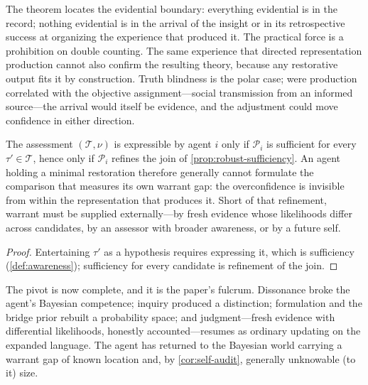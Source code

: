 The theorem locates the evidential boundary: everything evidential is in
the record; nothing evidential is in the arrival of the insight or in its
retrospective success at organizing the experience that produced it.  The
practical force is a prohibition on double counting.  The same experience
that directed representation production cannot also confirm the resulting
theory, because any restorative output fits it by construction.  Truth
blindness is the polar case; were production correlated with the objective
assignment---social transmission from an informed source---the arrival would
itself be evidence, and the adjustment could move confidence in either
direction.

\begin{corollary}
\label{cor:self-audit}
The assessment $(\mathcal T,\nu)$ is expressible by agent $i$ only if
$\mathcal P_i$ is sufficient for every $\tau'\in\mathcal T$, hence only if
$\mathcal P_i$ refines the join of \cref{prop:robust-sufficiency}.  An agent
holding a minimal restoration therefore generally cannot formulate the
comparison that measures its own warrant gap: the overconfidence is
invisible from within the representation that produces it.  Short of that
refinement, warrant must be supplied externally---by fresh evidence whose
likelihoods differ across candidates, by an assessor with broader awareness,
or by a future self.
\end{corollary}

\begin{proof}
Entertaining $\tau'$ as a hypothesis requires expressing it, which is
sufficiency (\cref{def:awareness}); sufficiency for every candidate is
refinement of the join.
\end{proof}

The pivot is now complete, and it is the paper's fulcrum.  Dissonance broke
the agent's Bayesian competence; inquiry produced a distinction; formulation
and the bridge prior rebuilt a probability space; and judgment---fresh
evidence with differential likelihoods, honestly accounted---resumes as
ordinary updating on the expanded language.  The agent has returned to the
Bayesian world carrying a warrant gap of known location and, by
\cref{cor:self-audit}, generally unknowable (to it) size.

